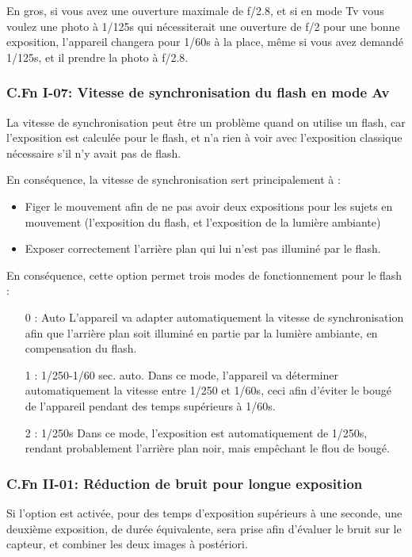\documentclass[a4paper,twoside]{article}
\begin{document}
En gros, si vous avez une ouverture maximale de f/2.8, et si en mode Tv vous voulez une photo à 1/125s qui nécessiterait une ouverture de f/2 pour une bonne exposition, l'appareil changera pour 1/60s à la place, même si vous avez demandé 1/125s, et il prendre la photo à f/2.8.

\subsubsection{C.Fn I-07: Vitesse de synchronisation du flash en mode Av}
La vitesse de synchronisation peut être un problème quand on utilise un flash, car l'exposition est calculée pour le flash, et n'a rien à voir avec l'exposition classique nécessaire s'il n'y avait pas de flash. 

En conséquence, la vitesse de synchronisation sert principalement à : 
\begin{itemize}
\item Figer le mouvement afin de ne pas avoir deux expositions pour les sujets en mouvement (l'exposition du flash, et l'exposition de la lumière ambiante)
\item Exposer correctement l'arrière plan qui lui n'est pas illuminé par le flash. 
\end{itemize}

En conséquence, cette option permet trois modes de fonctionnement pour le flash :
\begin{itemize}
\item[0 : Auto] L'appareil va adapter automatiquement la vitesse de synchronisation afin que l'arrière plan soit illuminé en partie par la lumière ambiante, en compensation du flash.
\item[1 : 1/250-1/60 sec. auto.] Dans ce mode, l'appareil va déterminer automatiquement la vitesse entre 1/250 et 1/60s, ceci afin d'éviter le bougé de l'appareil pendant des temps supérieurs à 1/60s.
\item[2 : 1/250s] Dans ce mode, l'exposition est automatiquement de 1/250s, rendant probablement l'arrière plan noir, mais empêchant le flou de bougé.
\end{itemize}

\subsubsection{C.Fn II-01: Réduction de bruit pour longue exposition}
Si l'option est activée, pour des temps d'exposition supérieurs à une seconde, une deuxième exposition, de durée équivalente, sera prise afin d'évaluer le bruit sur le capteur, et combiner les deux images à postériori.
\end{document}
